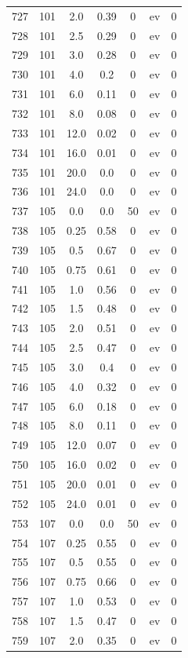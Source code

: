 \documentclass[12pt,a4paper]{article}
\begin{document}
\begin{tabular}{r|cccccc}
	727 & 101 & 2.0 & 0.39 & 0 & ev & 0 \\
	728 & 101 & 2.5 & 0.29 & 0 & ev & 0 \\
	729 & 101 & 3.0 & 0.28 & 0 & ev & 0 \\
	730 & 101 & 4.0 & 0.2 & 0 & ev & 0 \\
	731 & 101 & 6.0 & 0.11 & 0 & ev & 0 \\
	732 & 101 & 8.0 & 0.08 & 0 & ev & 0 \\
	733 & 101 & 12.0 & 0.02 & 0 & ev & 0 \\
	734 & 101 & 16.0 & 0.01 & 0 & ev & 0 \\
	735 & 101 & 20.0 & 0.0 & 0 & ev & 0 \\
	736 & 101 & 24.0 & 0.0 & 0 & ev & 0 \\
	737 & 105 & 0.0 & 0.0 & 50 & ev & 0 \\
	738 & 105 & 0.25 & 0.58 & 0 & ev & 0 \\
	739 & 105 & 0.5 & 0.67 & 0 & ev & 0 \\
	740 & 105 & 0.75 & 0.61 & 0 & ev & 0 \\
	741 & 105 & 1.0 & 0.56 & 0 & ev & 0 \\
	742 & 105 & 1.5 & 0.48 & 0 & ev & 0 \\
	743 & 105 & 2.0 & 0.51 & 0 & ev & 0 \\
	744 & 105 & 2.5 & 0.47 & 0 & ev & 0 \\
	745 & 105 & 3.0 & 0.4 & 0 & ev & 0 \\
	746 & 105 & 4.0 & 0.32 & 0 & ev & 0 \\
	747 & 105 & 6.0 & 0.18 & 0 & ev & 0 \\
	748 & 105 & 8.0 & 0.11 & 0 & ev & 0 \\
	749 & 105 & 12.0 & 0.07 & 0 & ev & 0 \\
	750 & 105 & 16.0 & 0.02 & 0 & ev & 0 \\
	751 & 105 & 20.0 & 0.01 & 0 & ev & 0 \\
	752 & 105 & 24.0 & 0.01 & 0 & ev & 0 \\
	753 & 107 & 0.0 & 0.0 & 50 & ev & 0 \\
	754 & 107 & 0.25 & 0.55 & 0 & ev & 0 \\
	755 & 107 & 0.5 & 0.55 & 0 & ev & 0 \\
	756 & 107 & 0.75 & 0.66 & 0 & ev & 0 \\
	757 & 107 & 1.0 & 0.53 & 0 & ev & 0 \\
	758 & 107 & 1.5 & 0.47 & 0 & ev & 0 \\
	759 & 107 & 2.0 & 0.35 & 0 & ev & 0 \\

\end{tabular}
\end{document}
